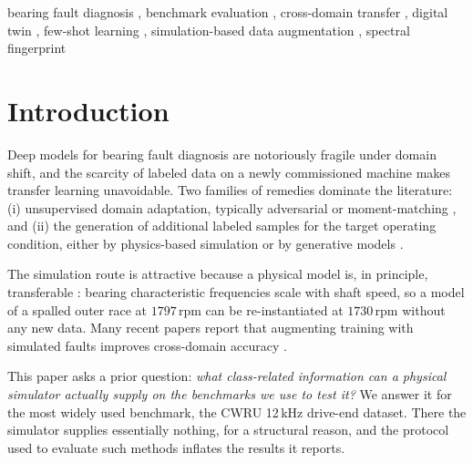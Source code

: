 \documentclass[preprint,12pt]{elsarticle}
\begin{document}
\begin{frontmatter}
\begin{keyword}
bearing fault diagnosis \sep
benchmark evaluation \sep
cross-domain transfer \sep
digital
twin \sep
few-shot learning \sep
simulation-based data augmentation \sep
spectral
fingerprint
\end{keyword}

\end{frontmatter}

\section{Introduction}
\label{sec:intro}

Deep models for bearing fault diagnosis are notoriously fragile under domain
shift, and the scarcity of labeled data on a newly commissioned machine makes
transfer learning unavoidable. Two families of remedies dominate the
literature: (i) unsupervised domain adaptation, typically adversarial
\cite{ganin2016dann} or moment-matching \cite{sun2016coral}, and (ii) the
generation of additional labeled samples
for the target operating condition, either by physics-based simulation
\cite{ming2026physics, xiao2026sim2real, liu2024twin} or by generative models
\cite{shao2019gan}.

The simulation route is attractive because a physical model is, in principle,
transferable \cite{karniadakis2021piml, tao2019dt}: bearing characteristic
frequencies scale with shaft speed, so a
model of a spalled outer race at $1797$\,rpm can be re-instantiated at
$1730$\,rpm without any new data. Many recent papers report that augmenting
training with simulated faults improves cross-domain accuracy
\cite{liu2024twin, xu2024dt, zhang2023dt, kumar2024dt, ming2026physics,
xiao2026sim2real}.

This paper asks a prior question: \emph{what class-related information can a
physical simulator actually supply on the benchmarks we use to test it?} We
answer it for the most widely used benchmark, the CWRU 12\,kHz drive-end
dataset. There the simulator supplies essentially nothing, for a structural
reason, and the protocol used to evaluate such methods inflates the results it
reports.
\end{document}
